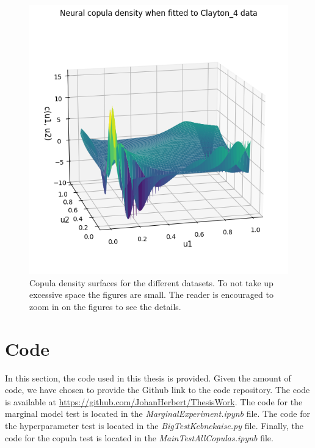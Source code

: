 \documentclass[%
a4paper,							
11pt,								
bibliography=totoc,						
abstracton=true					
]
{scrartcl}
\theoremstyle{plain}
\theoremstyle{definition}
\theoremstyle{remark}
\newcommand{\1}{\mathbbm{1}}
\begin{document}
\begin{figure}[H]
\begin{minipage}{0.49\textwidth}
    \end{minipage}
    \hfill
    \begin{minipage}{0.49\textwidth}
        \centering
        \includegraphics[width=\textwidth]{5ResultsDiscussion/pictures/PortfolioTest/GradPort4.png}
    \end{minipage}
    \caption{Copula density surfaces for the different datasets. To not take up excessive space the figures are small. The reader is encouraged to zoom in on the figures to see the details.}
    \label{fig:NeuralCopulaGradient}
\end{figure}





\newpage
\section{Code}\label{sec:Code}
In this section, the code used in this thesis is provided. Given the amount of code, we have chosen to provide the Github link to the code repository. The code is available at \url{https://github.com/JohanHerbert/ThesisWork}. The code for the marginal model test is located in the \emph{MarginalExperiment.ipynb} file. The code for the hyperparameter test is located in the \emph{BigTestKebnekaise.py} file. Finally, the code for the copula test is located in the \emph{MainTestAllCopulas.ipynb} file.  
\end{document}
